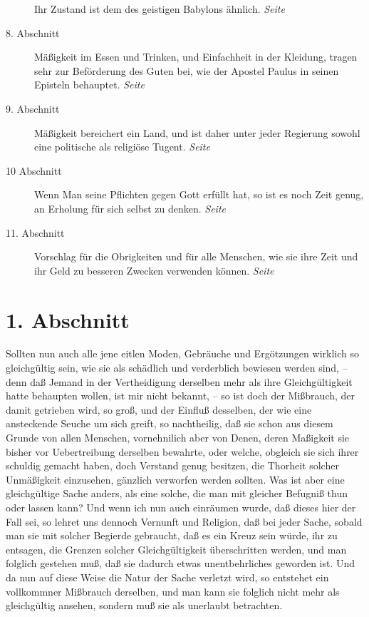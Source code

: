 \begin{description}
Ihr Zustand ist dem des geistigen Babylons ähnlich.
\dotfill \textit{Seite~\pageref{kap18_ab7}}\\
\item[8. Abschnitt] Mäßigkeit im Essen und Trinken, und Einfachheit in der
Kleidung, tragen sehr zur Beförderung des Guten bei, wie der Apostel Paulus in
seinen Episteln behauptet.
\dotfill \textit{Seite~\pageref{kap18_ab8}}\\
\item[9. Abschnitt] Mäßigkeit bereichert ein Land, und ist daher unter jeder
Regierung sowohl eine politische als religiöse Tugent.
\dotfill \textit{Seite~\pageref{kap18_ab9}}\\
\item[10 Abschnitt] Wenn Man seine Pflichten gegen Gott erfüllt hat, so ist es
noch Zeit genug, an Erholung für sich selbst zu denken.
\dotfill \textit{Seite~\pageref{kap18_ab10}}\\
\item[11. Abschnitt] Vorschlag für die Obrigkeiten und für alle Menschen, wie
sie ihre Zeit und ihr Geld zu besseren Zwecken verwenden können.
\dotfill \textit{Seite~\pageref{kap18_ab11}}\\

\end{description}

\newpage

\section{1. Abschnitt} \label{kap18_ab1}

Sollten nun auch alle jene eitlen Moden, Gebräuche und Ergötzungen wirklich so
gleichgültig sein, wie sie als schädlich und verderblich bewiesen werden sind,
-- denn daß Jemand in der Vertheidigung derselben mehr als ihre Gleichgültigkeit
hatte behaupten wollen, ist mir nicht bekannt, -- so ist doch der Mißbrauch, der
damit getrieben wird, so groß, und der Einfluß desselben, der wie eine
ansteckende Seuche um sich greift, so nachtheilig, daß sie schon aus diesem
Grunde von allen Menschen, vornehnilich aber von Denen, deren Maßigkeit sie
bisher vor Uebertreibung derselben bewahrte, oder welche, obgleich sie sich
ihrer schuldig gemacht haben, doch Verstand genug besitzen, die Thorheit solcher
Unmäßigkeit einzusehen, gänzlich verworfen werden sollten. Was ist aber eine
gleichgültige Sache anders, als eine solche, die man mit gleicher Befugniß thun
oder lassen kann? Und wenn ich nun auch einräumen wurde, daß dieses hier der
Fall sei, so lehret uns dennoch Vernunft und Religion, daß bei jeder Sache,
sobald man sie mit solcher Begierde gebraucht, daß es ein Kreuz
sein würde, ihr
zu entsagen, die Grenzen solcher Gleichgültigkeit überschritten werden, und man
folglich gestehen muß, daß sie dadurch etwas unentbehrliches geworden ist. Und
da nun auf diese Weise die Natur der Sache verletzt wird, so entstehet ein
vollkommner Mißbrauch derselben, und man kann sie folglich nicht mehr als
gleichgültig ansehen, sondern muß sie als unerlaubt betrachten.

